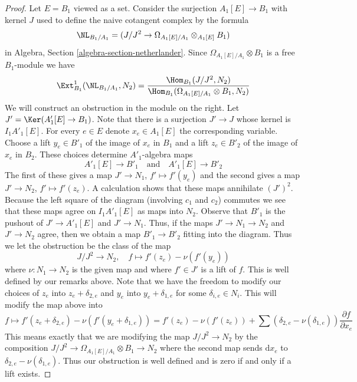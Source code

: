 \begin{proof}
Let $E = B_1$ viewed as a set.
Consider the surjection $A_1[E] \to B_1$ with kernel $J$ used
to define the naive cotangent complex by the formula
$$
\NL_{B_1/A_1} = (J/J^2 \to \Omega_{A_1[E]/A_1} \otimes_{A_1[E]} B_1)
$$
in
Algebra, Section \ref{algebra-section-netherlander}.
Since $\Omega_{A_1[E]/A_1} \otimes B_1$ is a free
$B_1$-module we have
$$
\Ext^1_{B_1}(\NL_{B_1/A_1}, N_2) =
\frac{\Hom_{B_1}(J/J^2, N_2)}
{\Hom_{B_1}(\Omega_{A_1[E]/A_1} \otimes B_1, N_2)}
$$
We will construct an obstruction in the module on the right.
Let $J' = \Ker(A'_1[E] \to B_1)$. Note that there is a surjection
$J' \to J$ whose kernel is $I_1A'_1[E]$.
For every $e \in E$ denote $x_e \in A_1[E]$ the corresponding variable.
Choose a lift $y_e \in B'_1$ of the image of $x_e$ in $B_1$ and
a lift $z_e \in B'_2$ of the image of $x_e$ in $B_2$.
These choices determine $A'_1$-algebra maps
$$
A'_1[E] \to B'_1 \quad\text{and}\quad A'_1[E] \to B'_2
$$
The first of these gives a map $J' \to N_1$, $f' \mapsto f'(y_e)$
and the second gives a map $J' \to N_2$, $f' \mapsto f'(z_e)$.
A calculation shows that these maps annihilate $(J')^2$.
Because the left square of the diagram (involving $c_1$ and $c_2$)
commutes we see that these maps agree on $I_1A'_1[E]$ as maps into $N_2$.
Observe that $B'_1$ is the pushout of $J' \to A'_1[E]$ and $J' \to N_1$.
Thus, if the maps $J' \to N_1 \to N_2$ and $J' \to N_2$ agree, then we
obtain a map $B'_1 \to B'_2$ fitting into the diagram.
Thus we let the obstruction be the class of the map
$$
J/J^2 \to N_2,\quad f \mapsto f'(z_e) - \nu(f'(y_e))
$$
where $\nu : N_1 \to N_2$ is the given map and where $f' \in J'$
is a lift of $f$. This is well defined by our remarks above.
Note that we have the freedom
to modify our choices of $z_e$ into $z_e + \delta_{2, e}$
and $y_e$ into $y_e + \delta_{1, e}$ for some $\delta_{i, e} \in N_i$.
This will modify the map above into
$$
f \mapsto f'(z_e + \delta_{2, e}) - \nu(f'(y_e + \delta_{1, e})) =
f'(z_e) - \nu(f'(z_e)) +
\sum (\delta_{2, e} - \nu(\delta_{1, e}))\frac{\partial f}{\partial x_e}
$$
This means exactly that we are modifying the map $J/J^2 \to N_2$
by the composition $J/J^2 \to \Omega_{A_1[E]/A_1} \otimes B_1 \to N_2$
where the second map sends $\text{d}x_e$ to
$\delta_{2, e} - \nu(\delta_{1, e})$. Thus our obstruction is well defined
and is zero if and only if a lift exists.


\end{proof}
